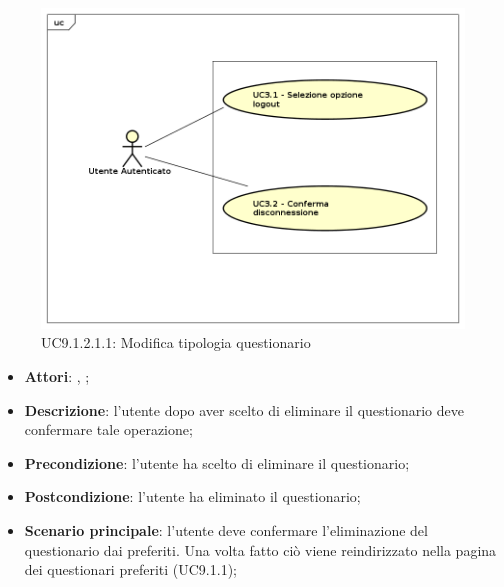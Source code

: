 					\label{UC9.1.1.1.1}
					\begin{figure}[h]
						\centering
						\includegraphics[scale=0.7,keepaspectratio]{UML/UC9.png}
						\caption{UC9.1.2.1.1: Modifica tipologia questionario}
					\end{figure}
					\FloatBarrier
					\begin{itemize}
						\item \textbf{Attori}: \uau, \uaupro;
						\item \textbf{Descrizione}: l'utente dopo aver scelto di eliminare il questionario deve confermare tale operazione;
						\item \textbf{Precondizione}: l'utente ha scelto di eliminare il questionario;
						\item \textbf{Postcondizione}: l'utente ha eliminato il questionario;
						\item \textbf{Scenario principale}: l'utente deve confermare l'eliminazione del questionario dai preferiti. Una volta fatto ciò viene reindirizzato nella pagina dei questionari preferiti (UC9.1.1);
					\end{itemize}
					
